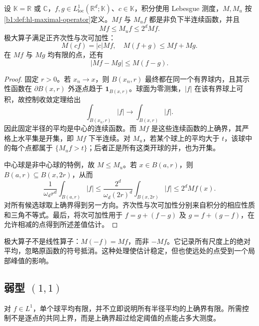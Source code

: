 \begin{proposition}\label{b1:prop:maximal-elementary}
设 \(\mathbb K=\mathbb R\) 或 \(\mathbb C\)，\(f,g\in L^1_{\mathrm{loc}}(\mathbb R^d;\mathbb K)\)、\(c\in\mathbb K\)，积分使用 Lebesgue 测度，\(M,M_u\) 按\cref{b1:def:hl-maximal-operator}定义。\(Mf\) 与 \(M_uf\) 都是非负下半连续函数，并且
\[
 Mf\leq M_uf\leq2^dMf.
\]
极大算子满足正齐次性与次可加性：
\[
 M(cf)=|c|Mf,\quad M(f+g)\leq Mf+Mg.
\]
在 \(Mf\) 与 \(Mg\) 均有限的点，还有
\[
 |Mf-Mg|\leq M(f-g).
\]
\end{proposition}
\begin{proof}
固定 \(r>0\)。若 \(x_n\to x\)，则 \(B(x_n,r)\) 最终都在同一个有界球内，且其示性函数在 \(\partial B(x,r)\) 外逐点趋于 \(\mathbf1_{B(x,r)}\)。球面为零测集，\(|f|\) 在该有界球上可积，故控制收敛定理给出
\[
 \int_{B(x_n,r)}|f|\longrightarrow\int_{B(x,r)}|f|.
\]
因此固定半径的平均是中心的连续函数。而 \(Mf\) 是这些连续函数的上确界，其严格上水平集是开集，即 \(Mf\) 下半连续。对 \(M_u\)，若某个球上的平均大于 \(t\)，该球中的每个点都属于 \(\{M_uf>t\}\)；后者正是所有这类开球的并，也为开集。

中心球是非中心球的特例，故 \(M\leq M_u\)。若 \(x\in B(a,r)\)，则 \(B(a,r)\subseteq B(x,2r)\)，从而
\[
 \frac1{\omega_dr^d}\int_{B(a,r)}|f|
 \leq\frac{2^d}{\omega_d(2r)^d}\int_{B(x,2r)}|f|
 \leq2^dMf(x).
\]
对所有候选球取上确界得到另一方向。齐次性与次可加性分别来自积分的相应性质和三角不等式。最后，将次可加性用于 \(f=g+(f-g)\) 及 \(g=f+(g-f)\)，在允许相减的点得到所述差值估计。
\end{proof}

极大算子不是线性算子：\(M(-f)=Mf\)，而非 \(-Mf\)。它记录所有尺度上的绝对平均，忽略原函数的符号抵消。这种处理使估计稳定，但也使远处的点受到一个局部峰值的影响。

\subsection{弱型 \texorpdfstring{\((1,1)\)}{(1,1)}}
\label{b1:subsec:130302}

对 \(f\in L^1\)，单个球平均有限，并不立即说明所有半径平均的上确界有限。所需控制不是逐点的共同上界，而是上确界超过给定阈值的点能占多大测度。

